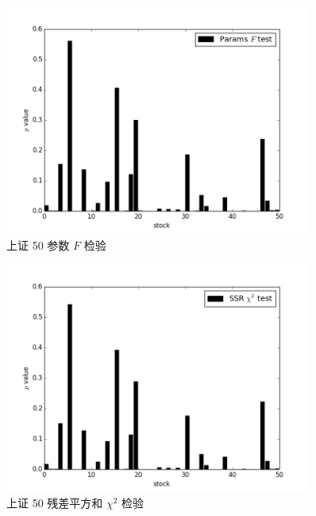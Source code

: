 \begin{figure}
  \centering
  \includegraphics[width=0.9\textwidth]{plots/granger_causality_test_on_sse_50_params_ftest.png}
  \caption{上证 50 参数 $F$ 检验}
  \label{f_test:13}
\end{figure}

\begin{figure}
  \centering
  \includegraphics[width=0.9\textwidth]{plots/granger_causality_test_on_sse_50_ssr_chi2test.png}
  \caption{上证 50 残差平方和 $\chi^{2}$ 检验}
  \label{f_test:14}
\end{figure}

